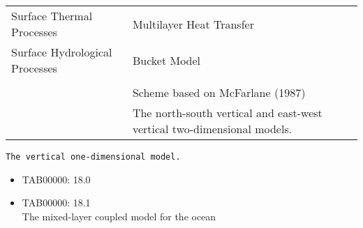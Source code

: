 \begin{longtable}[]{@{}ll@{}}
\begin{minipage}[t]{0.47\columnwidth}
Surface Thermal Processes\strut
\end{minipage} & \begin{minipage}[t]{0.47\columnwidth}\raggedright
Multilayer Heat Transfer\strut
\end{minipage}\tabularnewline
\begin{minipage}[t]{0.47\columnwidth}\raggedright
Surface Hydrological Processes\strut
\end{minipage} & \begin{minipage}[t]{0.47\columnwidth}\raggedright
Bucket Model\strut
\end{minipage}\tabularnewline
\begin{minipage}[t]{0.47\columnwidth}\raggedright
\strut
\end{minipage} & \begin{minipage}[t]{0.47\columnwidth}\raggedright
\strut
\end{minipage}\tabularnewline
\begin{minipage}[t]{0.47\columnwidth}\raggedright
\strut
\end{minipage} & \begin{minipage}[t]{0.47\columnwidth}\raggedright
Scheme based on McFarlane (1987)\strut
\end{minipage}\tabularnewline
\begin{minipage}[t]{0.47\columnwidth}\raggedright
\strut
\end{minipage} & \begin{minipage}[t]{0.47\columnwidth}\raggedright
The north-south vertical and east-west vertical two-dimensional
models.\strut
\end{minipage}\tabularnewline
\bottomrule
\end{longtable}

\begin{verbatim}
The vertical one-dimensional model.
\end{verbatim}

\begin{itemize}
\item
  TAB00000: 18.0
\item
  TAB00000: 18.1\\
  The mixed-layer coupled model for the ocean
\end{itemize}
